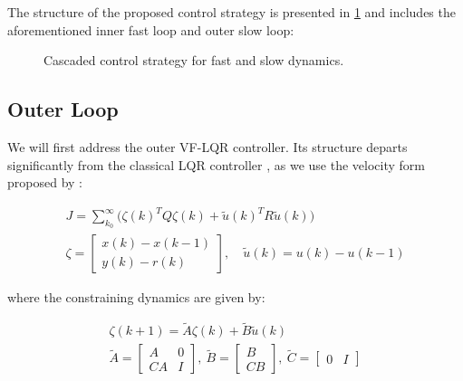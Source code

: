 The structure of the proposed control strategy is presented in \cref{fig:tikzControlStrat} and includes the aforementioned inner fast loop and outer slow loop:  

\begin{figure}[h!]
	\centering
	\resizebox{\columnwidth}{!}{
	}
	\caption{Cascaded control strategy for fast and slow dynamics.}
	\label{fig:tikzControlStrat}
\end{figure}

\subsection{Outer Loop}\label{subsec:OuterLoop}

We will first address the outer VF-LQR controller. Its structure departs significantly from the classical LQR controller \cite{Skogestad2005}, as we use the velocity form proposed by \cite{Pannocchia2001}:

\begin{equation}\label{eq:LagrangeProblemDeviation}
	\begin{gathered}
	J = \sum_{k_0}^{\infty} \big(\zeta(k)^TQ\zeta(k) + \tilde{u}(k)^TR\tilde{u}(k)\big) \\
	\zeta = \begin{bmatrix}	x(k)-x(k-1) \\ y(k)-r(k) \end{bmatrix}, \quad \tilde{u}(k) = u(k)-u(k-1) 
	\end{gathered}
\end{equation} 

where the constraining dynamics are given by:

\begin{equation}\label{eq:VelocityMatrices}
	\begin{gathered}
		\zeta(k+1) = \tilde{A}\zeta(k) + \tilde{B}\tilde{u}(k) \\
		\tilde{A} = \begin{bmatrix} A & 0 \\ CA & I	\end{bmatrix}, \ 
		\tilde{B} = \begin{bmatrix} B \\ CB	\end{bmatrix}, \ \tilde{C} = \begin{bmatrix} 0 & I	\end{bmatrix}
	\end{gathered}
\end{equation}

